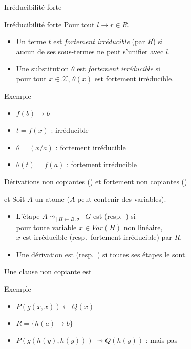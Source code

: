 \begin{frame}{Irréducibilité forte}
  \begin{block}{Irréducibilité forte}
    Pour tout $l \rightarrow r \in R$.\\
    \begin{itemize}[<+->]
    \item Un terme $t$ est {\em fortement irréducible} (par $R$) si\\
      aucun de ses sous-termes ne peut s'unifier avec $l$.\\
    \item Une substitution $\theta$ est {\em fortement irréducible} si\\
      pour tout $x \in \mathcal{X}$, $\theta(x)$ est fortement irréducible.
    \end{itemize}
  \end{block}
  \begin{exampleblock}{Exemple}
    \begin{itemize}
    \item {} $f(b) \rightarrow b$
    \item {} $t = f(x)$ :  irréducible
    \item {} $\theta = (x/a)$ :  fortement irréducible
    \item {} $\theta(t) = f(a)$ :  fortement irréducible
    \end{itemize}
  \end{exampleblock}
\end{frame}

\begin{frame}{{\large Dérivations non copiantes (\nc) et fortement non copiantes (\snc)}}
  \begin{block}{\nc et \snc}
    Soit $A$ un atome ($A$ peut contenir des variables).\\
    \begin{itemize}[<+->]
    \item L'étape $A \leadsto_{[H\leftarrow B,\sigma]} G$ est \nc (resp.\ \snc) si \\
      pour toute variable $x \in Var(H)$ non linéaire,\\
      $x$ est irréducible (resp.\ fortement irréducible) par $R$.\\
    \item Une dérivation est \nc (resp.\ \snc) si toutes ses étapes le sont.
    \end{itemize}
  \end{block}
   Une clause non copiante est \snc
  \begin{exampleblock}{Exemple}
    \begin{itemize}[<+(1)->]
    \item $P(g(x,x)) \leftarrow Q(x)$
    \item $R = \{h(a) \rightarrow b\}$
    \item $P(g(h(y),h(y)))$ $\leadsto Q(h(y))$ : \nc mais pas \snc
    \end{itemize}
  \end{exampleblock}
\end{frame}

